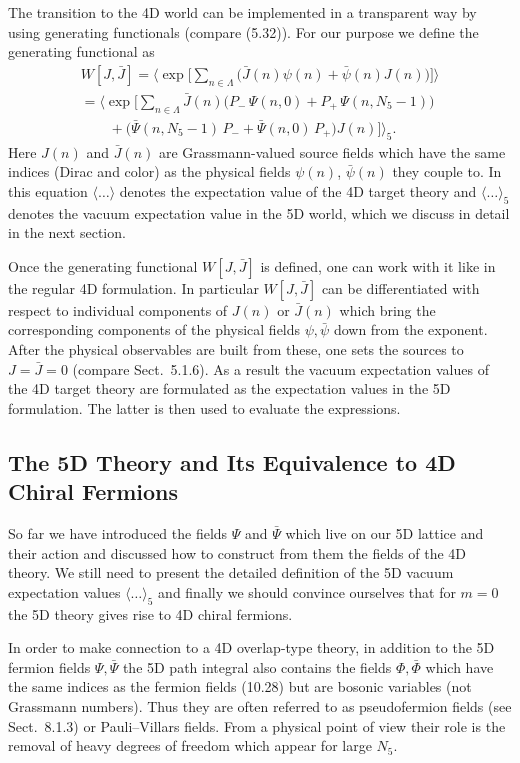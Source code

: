 The transition to the 4D world can be implemented in a transparent way by
using generating functionals (compare (5.32)). For our purpose we define the
generating functional as
\begin{multline}
  W[J, \bar J] =
  \bigg\langle \exp\Big[\sum_{n\in\Lambda}
  \big(\bar J(n)\psi(n) + \bar\psi(n)J(n)\big)\Big]\bigg\rangle \\
  = \bigg\langle \exp\Big[\sum_{n\in\Lambda}
  \bar J(n)\big(P_-\,\Psi(n, 0) + P_+\,\Psi(n, N_5 - 1)\big) \\
  \qquad
  + \big(\bar\Psi(n, N_5 - 1)\, P_- + \bar\Psi(n, 0)\, P_+\big) J(n)
  \Big]\bigg\rangle_5 .
\end{multline}
Here $J(n)$ and $\bar J(n)$ are Grassmann-valued source fields which have the
same indices (Dirac and color) as the physical fields $\psi(n)$, $\bar\psi(n)$
they couple to. In this equation $\langle\ldots\rangle$ denotes the
expectation value of the 4D target theory and $\langle\ldots\rangle_5$ denotes
the vacuum expectation value in the 5D world, which we discuss in detail in
the next section.

Once the generating functional $W[J, \bar J]$ is defined, one can work with it
like in the regular 4D formulation. In particular $W[J, \bar J]$ can be
differentiated with respect to individual components of $J(n)$ or $\bar J(n)$
which bring the corresponding components of the physical fields $\psi,
\bar\psi$ down from the exponent. After the physical observables are built
from these, one sets the sources to $J = \bar J = 0$ (compare Sect.~5.1.6). As
a result the vacuum expectation values of the 4D target theory are formulated
as the expectation values in the 5D formulation. The latter is then used to
evaluate the expressions.

\subsection{The 5D Theory and Its Equivalence to 4D Chiral Fermions}

So far we have introduced the fields $\Psi$ and $\bar\Psi$ which live on our
5D lattice and their action and discussed how to construct from them the
fields of the 4D theory. We still need to present the detailed definition of
the 5D vacuum expectation values $\langle\ldots\rangle_5$ and finally we
should convince ourselves that for $m = 0$ the 5D theory gives rise to 4D
chiral fermions.

In order to make connection to a 4D overlap-type theory, in addition to the 5D
fermion fields $\Psi, \bar\Psi$ the 5D path integral also contains the fields
$\Phi, \bar\Phi$ which have the same indices as the fermion fields (10.28) but
are bosonic variables (not Grassmann numbers). Thus they are often referred to
as pseudofermion fields (see Sect.~8.1.3) or Pauli--Villars fields. From a
physical point of view their role is the removal of heavy degrees of freedom
which appear for large $N_5$.

